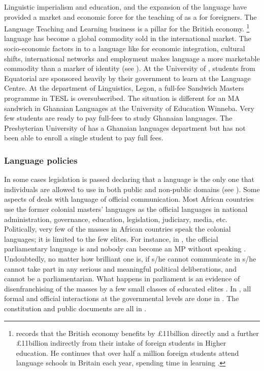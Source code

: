 \documentclass[output=paper,
modfonts
]{langscibook}
\begin{document}
Linguistic imperialism and education, and the expansion of the  language have provided a market and economic force for the teaching of  as a  for foreigners. The  Language Teaching and Learning business is a  pillar for the British economy.{ }\footnote{\citet[781]{Phillipson2009} records that the British economy benefits by £11billion directly and a further £11billion indirectly from their intake of foreign students in Higher education. He continues that over half a million foreign students attend language schools in Britain each year, spending time in learning .}  language has become a global commodity sold in the international market. The socio-economic factors in  to a language like  for economic integration, cultural shifts, international networks and employment makes language a more marketable commodity than a marker of identity (see \citealt[21]{Austin2011}). At the University of , students from Equatorial  are sponsored heavily by their government to learn  at the Language Centre. At the department of Linguistics, Legon, a full-fee Sandwich Masters programme in TESL is oversubscribed. The situation is different for an MA sandwich in Ghanaian Languages at the University of Education Winneba. Very few students are ready to pay full-fees to study Ghanaian languages. The Presbyterian University of  has a Ghanaian languages department but has not been able to enroll a single student to pay full fees. 

\subsubsection{Language policies }

In some cases legislation is passed declaring that a language is the only one that individuals are allowed to use in both public and non-public domains (see \citealt[677]{Lewis2013}). Some aspects of  deals with language of official communication. Most African countries use the former colonial masters’ languages as the official languages in national administration, governance, education, legislation, judiciary, media, etc. Politically, very few of the masses in African countries speak the colonial languages; it is limited to the few elites. For instance, in , the official parliamentary language is  and nobody can become an MP without speaking . Undoubtedly, no matter how brilliant one is, if s/he cannot communicate in  s/he cannot take part in any serious and meaningful political deliberations, and cannot be a parliamentarian. What happens in parliament is an evidence of disenfranchising of the masses by a few small classes of educated elites \citep{Bamgbose2000}. In , all formal and official interactions at the governmental levels are done in . The constitution and public documents are all in . 
\end{document}
